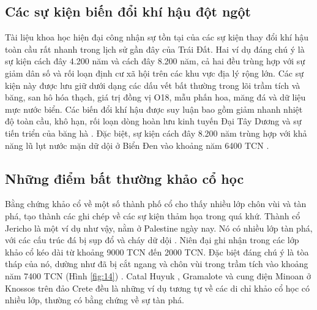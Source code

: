 \documentclass[10pt,twocolumn,letterpaper]{article}
\begin{document}
\subsection{Các sự kiện biến đổi khí hậu đột ngột}

Tài liệu khoa học hiện đại công nhận sự tồn tại của các sự kiện thay đổi khí hậu toàn cầu rất nhanh trong lịch sử gần đây của Trái Đất. Hai ví dụ đáng chú ý là sự kiện cách đây 4.200 năm và cách đây 8.200 năm, cả hai đều trùng hợp với sự giảm dân số và rối loạn định cư xã hội trên các khu vực địa lý rộng lớn. Các sự kiện này được lưu giữ dưới dạng các dấu vết bất thường trong lõi trầm tích và băng, san hô hóa thạch, giá trị đồng vị O18, mẫu phấn hoa, măng đá và dữ liệu mực nước biển. Các biến đổi khí hậu được suy luận bao gồm giảm nhanh nhiệt độ toàn cầu, khô hạn, rối loạn dòng hoàn lưu kinh tuyến Đại Tây Dương và sự tiến triển của băng hà \cite{90,91,92}. Đặc biệt, sự kiện cách đây 8.200 năm trùng hợp với khả năng lũ lụt nước mặn dữ dội ở Biển Đen vào khoảng năm 6400 TCN \cite{93}.

\subsection{Những điểm bất thường khảo cổ học}

Bằng chứng khảo cổ về một số thành phố cổ cho thấy nhiều lớp chôn vùi và tàn phá, tạo thành các ghi chép về các sự kiện thảm họa trong quá khứ. Thành cổ Jericho là một ví dụ như vậy, nằm ở Palestine ngày nay. Nó có nhiều lớp tàn phá, với các cấu trúc đá bị sụp đổ và cháy dữ dội \cite{96,97}. Niên đại ghi nhận trong các lớp khảo cổ kéo dài từ khoảng 9000 TCN đến 2000 TCN. Đặc biệt đáng chú ý là tòa tháp của nó, dường như đã bị cắt ngang và chôn vùi trong trầm tích vào khoảng năm 7400 TCN (Hình \ref{fig:14}) \cite{95}. Catal Huyuk \cite{99}, Gramalote \cite{98} và cung điện Minoan ở Knossos trên đảo Crete \cite{100,101} đều là những ví dụ tương tự về các di chỉ khảo cổ học có nhiều lớp, thường có bằng chứng về sự tàn phá.
\end{document}
